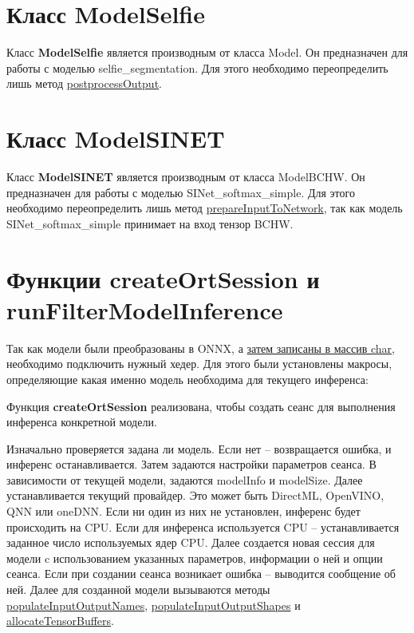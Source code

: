 \documentclass[a4paper,14pt]{extreport}
\begin{document}
        \section{Класс ModelSelfie}
        Класс \textbf{ModelSelfie} является производным от класса Model. Он предназначен для работы с моделью selfie\_segmentation. Для этого необходимо переопределить лишь метод \hyperlink{postprocess}{postprocessOutput}.
        

        \section{Класс ModelSINET}
        Класс \textbf{ModelSINET} является производным от класса ModelBCHW. Он предназначен для работы с моделью SINet\_softmax\_simple. Для этого необходимо переопределить лишь метод \hyperlink{prepareInput}{prepareInputToNetwork}, так как модель SINet\_softmax\_simple принимает на вход тензор BCHW.
        

        \section{Функции createOrtSession и runFilterModelInference}
        Так как модели были преобразованы в ONNX, а \hyperlink{loader}{затем записаны в массив char}, необходимо подключить нужный хедер. Для этого были установлены макросы, определяющие какая именно модель необходима для текущего инференса:
        

        Функция \hypertarget{createOrt}{}\textbf{createOrtSession} реализована, чтобы создать сеанс для выполнения инференса конкретной модели. 
        
        Изначально проверяется задана ли модель. Если нет -- возвращается ошибка, и инференс останавливается. Затем задаются настройки параметров сеанса. В зависимости от текущей модели, задаются modelInfo и modelSize. Далее устанавливается текущий провайдер. Это может быть DirectML, OpenVINO, QNN или oneDNN. Если ни один из них не установлен, инференс будет происходить на CPU. Если для инференса используется CPU -- устанавливается заданное число используемых ядер CPU. Далее создается новая сессия для модели c использованием указанных параметров, информации о ней и опции сеанса. Если при создании сеанса возникает ошибка -- выводится сообщение об ней. Далее для созданной модели вызываются методы \hyperlink{populateNames}{populateInputOutputNames}, \hyperlink{populateShapes}{populateInputOutputShapes} и \hyperlink{allocate}{allocateTensorBuffers}.
        
\end{document}
